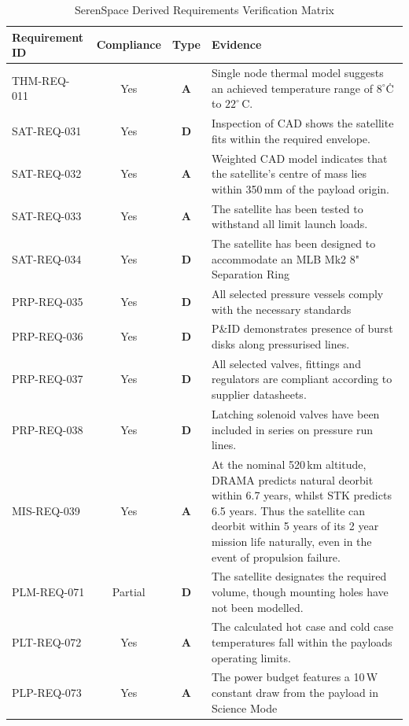 \documentclass[a4paper, 11pt, conference]{IEEEtran}
\begin{document}
\begin{table}[H]
\centering
\caption{SerenSpace Derived Requirements Verification Matrix}
\label{tab:SSReqs_VCM}
\begin{tabularx}{\textwidth}{l c c X}
\toprule
\textbf{Requirement ID} & \textbf{Compliance} & \textbf{Type} & \textbf{Evidence}\\
\midrule
THM-REQ-011 & Yes & \textbf{A} & Single node thermal model suggests an achieved temperature range of $8^\circ$\.C to $22^\circ$\,C.  \\
SAT-REQ-031 & Yes & \textbf{D} & Inspection of CAD shows the satellite fits within the required envelope. \\
SAT-REQ-032 & Yes & \textbf{A} & Weighted CAD model indicates that the satellite's centre of mass lies within 350\,mm of the payload origin. \\
SAT-REQ-033 & Yes & \textbf{A} & The satellite has been tested to withstand all limit launch loads. \\
SAT-REQ-034 & Yes & \textbf{D} & The satellite has been designed to accommodate an MLB Mk2 8" Separation Ring  \\
PRP-REQ-035 & Yes & \textbf{D} & All selected pressure vessels comply with the necessary standards \\
PRP-REQ-036 & Yes & \textbf{D} & P\&ID demonstrates presence of burst disks along pressurised lines. \\
PRP-REQ-037 & Yes & \textbf{D} & All selected  valves, fittings and regulators are compliant according to supplier datasheets.  \\
PRP-REQ-038 & Yes & \textbf{D} & Latching solenoid valves have been included in series on pressure run lines. \\
MIS-REQ-039 & Yes & \textbf{A} & At the nominal 520\,km altitude, DRAMA predicts natural deorbit within 6.7 years, whilst STK predicts 6.5 years. Thus the satellite can deorbit within 5 years of its 2 year mission life naturally, even in the event of propulsion failure.  \\
PLM-REQ-071 & Partial & \textbf{D} & The satellite designates the required volume, though mounting holes have not been modelled. \\
PLT-REQ-072 & Yes & \textbf{A} & The calculated hot case and cold case temperatures fall within the payloads operating limits. \\
PLP-REQ-073 & Yes & \textbf{A} & The power budget features a 10\,W constant draw from the payload in Science Mode \\

\end{tabularx}
\end{table}
\end{document}
